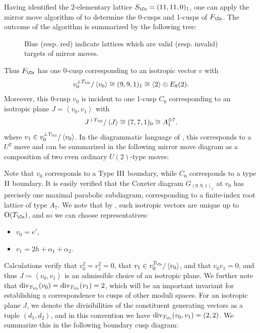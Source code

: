 \documentclass{amsart}
\providecommand{\tightlist}{%
  \setlength{\itemsep}{0pt}\setlength{\parskip}{0pt}}
\begin{document}
\begin{remark}

Having identified the 2-elementary lattice \(S_\Co = (11, 11, 0)_1\), one can apply the mirror move algorithm of \cite[Thm. 5.10]{AE22nonsympinv} to determine the 0-cusps and 1-cusps of \(F_\Co\). The outcome of the algorithm is summarized by the following tree:

\begin{figure}[H]
\centering

\caption{Blue (resp. red) indicate lattices which are valid (resp. invalid) targets of mirror moves.}
\label{fig:unlabeledtwo}
\end{figure}

Thus \(F_{\Co}\) has one 0-cusp corresponding to an isotropic vector \(v\) with \[
v_0^{\perp T_{\Co}}/\left\langle{v_0}\right\rangle \cong (9,9,1)_1 \cong \left\langle{2}\right\rangle \oplus E_{8}(2)
.\] Moreover, this 0-cusp \(v_0\) is incident to one 1-cusp \(C_0\) corresponding to an isotropic plane \(J = \left\langle{v_0, v_1}\right\rangle\) with \[
J^{\perp T_{\Co}}/\left\langle{J}\right\rangle \cong (7,7,1)_0 \cong A_1^{\oplus 7}
.\] where \(v_1 \in v_0^{\perp T_{\Co}}/\left\langle{v_0}\right\rangle\). In the diagrammatic language of \cite[Fig.\, 1, Thm.\,5.10]{AE22nonsympinv}, this corresponds to a \(U^2\) move and can be summarized in the following mirror move diagram as a composition of two even ordinary \(U(2)\)-type moves:

\begin{figure}[H]
\centering

\caption{}
\label{fig:unlabeledthree}
\end{figure}

Note that \(v_0\) corresponds to a Type \(\rm{III}\) boundary, while \(C_0\) corresponds to a type \(\rm{II}\) boundary. It is easily verified that the Coxeter diagram \(G_{(9,9,1)_1}\) at \(v_0\) has precisely one maximal parabolic subdiagram, corresponding to a finite-index root lattice of type \(A_7\). We note that by \cite[\S 5]{AE22nonsympinv}, such isotropic vectors are unique up to \({\operatorname{O}}(T_\Co)\), and so we can choose representatives:

\begin{itemize}
\tightlist
\item
  \(v_0 = e'\),
\item
  \(v_1 = 2h + \alpha_1 + \alpha_2\).
\end{itemize}

Calculations verify that \(v_0^2 = v_1^2 = 0\), that \(v_1 \in v_0^{T_{\Co}}/\left\langle{v_0}\right\rangle\), and that \(v_0v_1 = 0\), and thus \(J \coloneqq\left\langle{v_0, v_1}\right\rangle\) is an admissible choice of an isotropic plane. We further note that \(\operatorname{div}_{T_{\Co}}(v_0) = \operatorname{div}_{T_{\Co}}(v_1) = 2\), which will be an important invariant for establishing a correspondence to cusps of other moduli spaces. For an isotropic plane \(J\), we denote the divisibilities of the constituent generating vectors as a tuple \((d_1, d_2)\), and in this convention we have \(\operatorname{div}_{T_{\Co}}(v_0, v_1) = (2, 2)\). We summarize this in the following boundary cusp diagram:


\end{remark}
\end{document}
